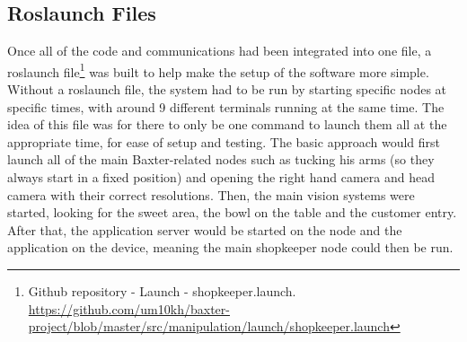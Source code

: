 \subsection{Roslaunch Files}
Once all of the code and communications had been integrated into one file, a roslaunch file\footnote{Github repository - Launch - shopkeeper.launch. \url{https://github.com/um10kh/baxter-project/blob/master/src/manipulation/launch/shopkeeper.launch}} was built to help make the setup of the software more simple. Without a roslaunch file, the system had to be run by starting specific nodes at specific times, with around 9 different terminals running at the same time. The idea of this file was for there to only be one command to launch them all at the appropriate time, for ease of setup and testing. The basic approach would first launch all of the main Baxter-related nodes such as tucking his arms (so they always start in a fixed position) and opening the right hand camera and head camera with their correct resolutions. Then, the main vision systems were started, looking for the sweet area, the bowl on the table and the customer entry. After that, the application server would be started on the node and the application on the device, meaning the main shopkeeper node could then be run.
